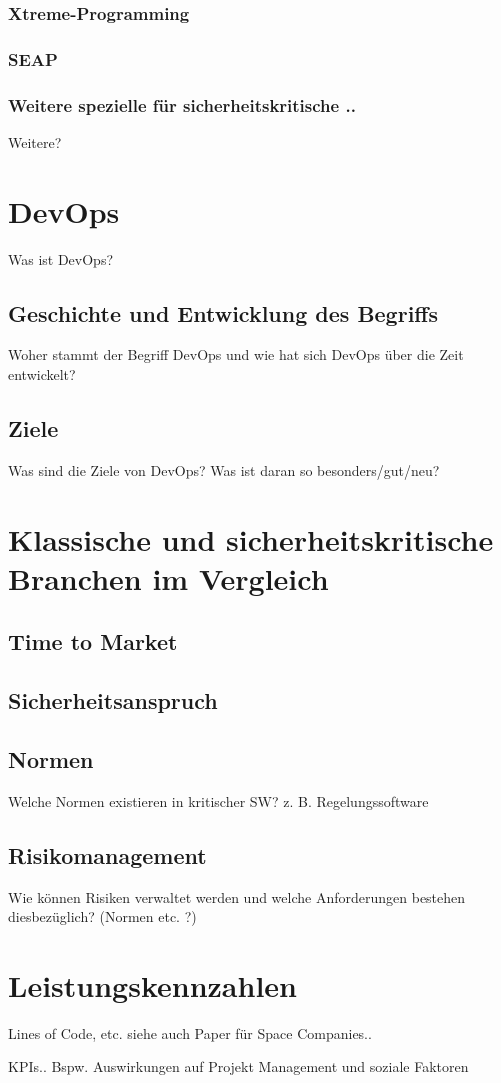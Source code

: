 \subsubsection{Xtreme-Programming}

\subsubsection{SEAP}

\subsubsection{Weitere spezielle für sicherheitskritische ..}
Weitere?

\section{DevOps}
Was ist DevOps?

\subsection{Geschichte und Entwicklung des Begriffs}
Woher stammt der Begriff DevOps und wie hat sich DevOps über die Zeit entwickelt?

\subsection{Ziele}
Was sind die Ziele von DevOps? Was ist daran so besonders/gut/neu?

\section{Klassische und sicherheitskritische Branchen im Vergleich}

\subsection{Time to Market}

\subsection{Sicherheitsanspruch}

\subsection{Normen}

Welche Normen existieren in kritischer SW? z. B. Regelungssoftware

\subsection{Risikomanagement}

Wie können Risiken verwaltet werden und welche Anforderungen bestehen diesbezüglich? (Normen etc. ?)

\section{Leistungskennzahlen}

Lines of Code, etc.
siehe auch Paper für Space Companies..

KPIs..
Bspw. Auswirkungen auf Projekt Management und soziale Faktoren
